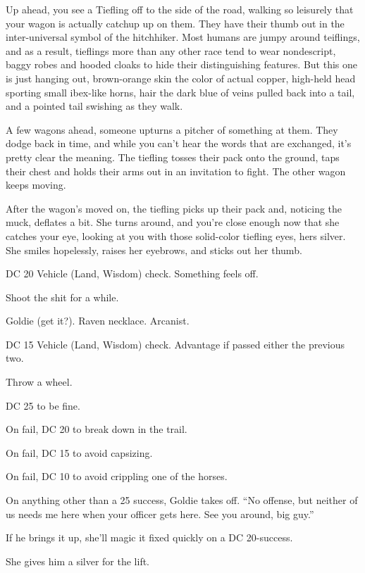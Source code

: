 \begin{multicols}{2}
  \begin{aloud}
  Up ahead, you see a Tiefling off to the side of the road,
    walking so leisurely that your wagon is actually catchup up on them.
  They have their thumb out in the inter-universal symbol of the hitchhiker.
  Most humans are jumpy around teiflings, and as a result, tieflings more than any other race tend
    to wear nondescript, baggy robes and hooded cloaks to hide their distinguishing features.
  But this one is just hanging out, brown-orange skin the color of actual copper,
    high-held head sporting small ibex-like horns,
    hair the dark blue of veins pulled back into a tail,
    and a pointed tail swishing as they walk.

  A few wagons ahead, someone upturns a pitcher of something at them.
  They dodge back in time, and while you can't hear the words that are exchanged, it's pretty clear
    the meaning.
  The tiefling tosses their pack onto the ground, taps their chest and holds their arms out in
    an invitation to fight.
  The other wagon keeps moving.

  After the wagon's moved on, the tiefling picks up their pack and, noticing the muck, deflates
    a bit.
  She turns around, and you're close enough now that she catches your eye, looking at you with
    those solid-color tiefling eyes, hers silver.
  She smiles hopelessly, raises her eyebrows, and sticks out her thumb.
  \end{aloud}

DC 20 Vehicle (Land, Wisdom) check.
Something feels off.

Shoot the shit for a while.

Goldie (get it?).
Raven necklace.
Arcanist.

DC 15 Vehicle (Land, Wisdom) check.
Advantage if passed either the previous two.

Throw a wheel.

DC 25 to be fine.

On fail, DC 20 to break down in the trail.

On fail, DC 15 to avoid capsizing.

On fail, DC 10 to avoid crippling one of the horses.

On anything other than a 25 success, Goldie takes off.
``No offense, but neither of us needs me here when your officer gets here.
See you around, big guy.''

If he brings it up, she'll magic it fixed quickly on a DC 20-success.

She gives him a silver for the lift.


\end{multicols}
